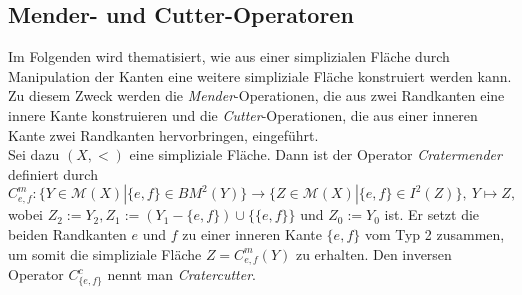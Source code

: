 \documentclass[12pt,titlepage,twoside,cleardoublepage]{article}
\theoremstyle{nummermitklammern}
\numberwithin{equation}{section}
\begin{document}
  \subsection{Mender- und Cutter-Operatoren}
  Im Folgenden wird thematisiert, wie aus einer simplizialen Fläche durch Manipulation der Kanten eine weitere simpliziale Fläche konstruiert werden kann. Zu diesem Zweck werden die \emph{Mender}-Operationen, die aus zwei Randkanten eine innere Kante konstruieren  und die \emph{Cutter}-Operationen, die aus einer inneren Kante zwei Randkanten hervorbringen, eingeführt.\\
  Sei dazu $(X,<)$ eine simpliziale Fläche.
 Dann ist der Operator \emph{Cratermender} definiert durch
\[
 C_{e,f}^{m}:\{Y \in \mathcal{M}(X)|\{e,f\} \in BM^{2}(Y) \}   \to 
  \{Z \in \mathcal{M}(X)|\{e,f\} \in I^{2}(Z)\},\
  Y \mapsto Z,
  \]
  wobei $Z_{2}:=Y_{2},Z_{1}:=(Y_{1}-\{e,f\}) \cup \{\{e,f\}\}$ und $Z_0:=Y_{0}$ ist.
  Er setzt die beiden Randkanten $e$ und $f$ zu einer inneren Kante $\{e,f\}$ vom Typ 2 zusammen, um somit die simpliziale Fläche $Z=C^{m}_{e,f}(Y)$ zu erhalten. Den inversen Operator $C^{c}_{\{e,f\}}$ nennt man \emph{Cratercutter}. 
\end{document}
